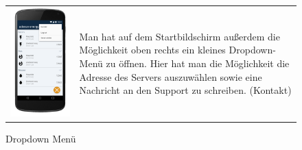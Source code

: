 \begin{figure}[h]
\begin{tabularx}{\textwidth}{X  X}
	\includegraphics[scale = 0.155]{img/AndroidMockup/dropdown} \caption{Dropdown Menü} & Man hat auf dem Startbildschirm außerdem die Möglichkeit oben rechts ein kleines Dropdown-Menü zu öffnen. Hier hat man die Möglichkeit die Adresse des Servers auszuwählen sowie eine Nachricht an den Support zu schreiben. (Kontakt) \\

\end{tabularx}
\end{figure}
